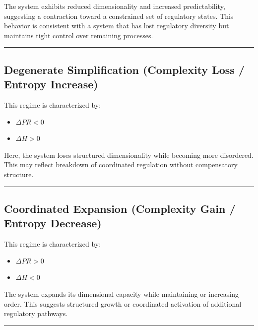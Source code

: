 \documentclass[
  letterpaper,
  DIV=11,
  numbers=noendperiod,
  openany,
  oneside]{scrreprt}
\providecommand{\tightlist}{%
  \setlength{\itemsep}{0pt}\setlength{\parskip}{0pt}}
\begin{document}
The system exhibits reduced dimensionality and increased predictability,
suggesting a contraction toward a constrained set of regulatory states.
This behavior is consistent with a system that has lost regulatory
diversity but maintains tight control over remaining processes.

\begin{center}\rule{0.5\linewidth}{0.5pt}\end{center}

\subsection{Degenerate Simplification (Complexity Loss / Entropy
Increase)}\label{degenerate-simplification-complexity-loss-entropy-increase}

This regime is characterized by:

\begin{itemize}
\tightlist
\item
  \(\Delta PR < 0\)\\
\item
  \(\Delta H > 0\)
\end{itemize}

Here, the system loses structured dimensionality while becoming more
disordered. This may reflect breakdown of coordinated regulation without
compensatory structure.

\begin{center}\rule{0.5\linewidth}{0.5pt}\end{center}

\subsection{Coordinated Expansion (Complexity Gain / Entropy
Decrease)}\label{coordinated-expansion-complexity-gain-entropy-decrease}

This regime is characterized by:

\begin{itemize}
\tightlist
\item
  \(\Delta PR > 0\)\\
\item
  \(\Delta H < 0\)
\end{itemize}

The system expands its dimensional capacity while maintaining or
increasing order. This suggests structured growth or coordinated
activation of additional regulatory pathways.

\begin{center}\rule{0.5\linewidth}{0.5pt}\end{center}
\end{document}
